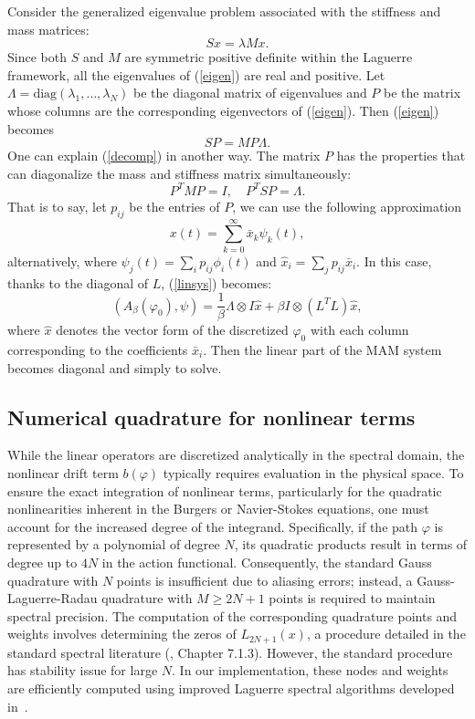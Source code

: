 \documentclass[a4paper,fleqn, 12pt]{cas-sc}
\numberwithin{table}{section}
\begin{document}
Consider the generalized eigenvalue problem associated with the stiffness and mass matrices:
\begin{equation}
\label{eigen} Sx = \lambda Mx.
\end{equation}
Since both $S$ and $M$ are symmetric positive definite within the Laguerre framework, all the eigenvalues of (\ref{eigen}) are real and positive. Let $\Lambda = \text{diag}(\lambda_1, \dots, \lambda_N)$ be the diagonal matrix of eigenvalues and $P$  be the matrix whose columns are the
corresponding eigenvectors of (\ref{eigen}). Then (\ref{eigen}) becomes
\begin{equation}
	\label{decomp} SP = MP \Lambda .
\end{equation}
One can explain (\ref{decomp}) in another way. The matrix $P$ has the
properties that can diagonalize the mass and stiffness matrix simultaneously:
\[
P^T MP = I, \quad P^T S P = \Lambda.
\]
That is to say, let $p_{ij}$ be the entries of $P$, we can use the following
approximation
\[ x (t) = \sum_{k = 0}^{\infty} \bar{x}_k \psi_k (t), \]
alternatively, where $\psi_j (t) = \sum_i p_{ij} \phi_i (t)$ and $\hat{x}_i =
\sum_j p_{ij}  \bar{x}_i$.
In this case, thanks to the diagonal of $L$, (\ref{linsys}) becomes:
\[
	(A_{\beta} (\varphi_0), \psi) = \dfrac{1}{\beta} \Lambda \otimes I \hat{x} +
	\beta I \otimes (L^T L)  \hat{x},
\]
where $\hat{x}$ denotes the vector form of the discretized $\varphi_0$ with
each column corresponding to the coefficients $\bar{x}_i$. Then the linear
part of the MAM system becomes diagonal and simply to solve. 

\subsection{Numerical quadrature for nonlinear terms}

While the linear operators are discretized analytically in the spectral domain, the nonlinear drift term $b(\varphi)$ typically requires evaluation in the physical space.  To ensure the exact integration of nonlinear terms, particularly for the quadratic nonlinearities inherent in the Burgers or Navier-Stokes equations, one must account for the increased degree of the integrand. Specifically, if the path $\varphi$ is represented by a polynomial of degree $N$, its quadratic products result in terms of degree up to $4N$ in the action functional. Consequently, the standard Gauss quadrature with $N$ points is insufficient due to aliasing errors; instead, a Gauss-Laguerre-Radau quadrature with $M \ge 2N+1$ points is required to maintain spectral precision. The computation of the corresponding quadrature points and weights involves determining the zeros of $L_{2N+1}(x)$, a procedure detailed in the standard spectral literature (\cite{shen_spectral_2011}, Chapter 7.1.3). However, the standard procedure has stability issue for large $N$. In our implementation, these nodes and weights are efficiently computed using improved Laguerre spectral algorithms developed in~\cite{huang2024improved}.
\end{document}
